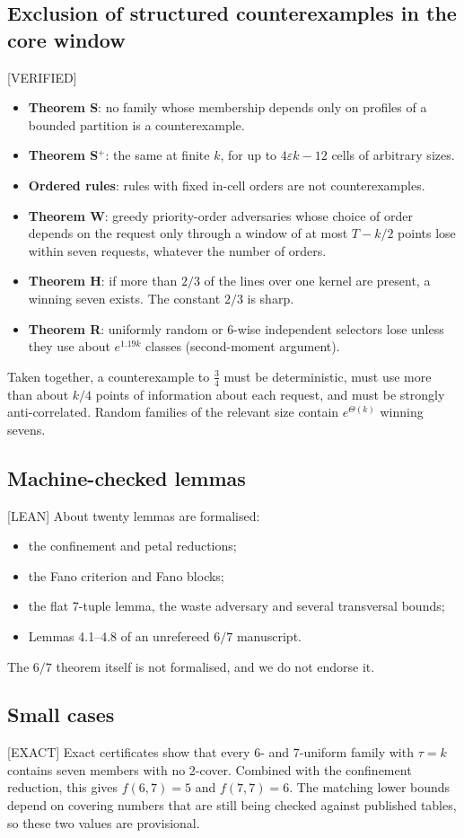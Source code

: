 \documentclass[11pt]{article}
\newcommand{\lvl}[1]{\textsf{\small[#1]}}
\begin{document}
\subsection{Exclusion of structured counterexamples in the core window} \lvl{VERIFIED}
\begin{itemize}
\item \textbf{Theorem S}: no family whose membership depends only on profiles of a bounded partition is a
counterexample.
\item \textbf{Theorem S$^+$}: the same at finite $k$, for up to $4\varepsilon k-12$ cells of arbitrary sizes.
\item \textbf{Ordered rules}: rules with fixed in-cell orders are not counterexamples.
\item \textbf{Theorem W}: greedy priority-order adversaries whose choice of order depends on the request only through a
window of at most $T-k/2$ points lose within seven requests, whatever the number of orders.
\item \textbf{Theorem H}: if more than $2/3$ of the lines over one kernel are present, a winning seven exists. The
constant $2/3$ is sharp.
\item \textbf{Theorem R}: uniformly random or 6-wise independent selectors lose unless they use about $e^{1.19k}$
classes (second-moment argument).
\end{itemize}
Taken together, a counterexample to $\tfrac34$ must be deterministic, must use more than about $k/4$ points of
information about each request, and must be strongly anti-correlated. Random families of the relevant size contain
$e^{\Theta(k)}$ winning sevens.

\subsection{Machine-checked lemmas} \lvl{LEAN}
About twenty lemmas are formalised:
\begin{itemize}
\item the confinement and petal reductions;
\item the Fano criterion and Fano blocks;
\item the flat 7-tuple lemma, the waste adversary and several transversal bounds;
\item Lemmas 4.1--4.8 of an unrefereed $6/7$ manuscript.
\end{itemize}
The $6/7$ theorem itself is not formalised, and we do not endorse it.

\subsection{Small cases} \lvl{EXACT}
Exact certificates show that every $6$- and $7$-uniform family with $\tau=k$ contains seven members with no 2-cover.
Combined with the confinement reduction, this gives $f(6,7)=5$ and $f(7,7)=6$. The matching lower bounds depend on
covering numbers that are still being checked against published tables, so these two values are provisional.
\end{document}
